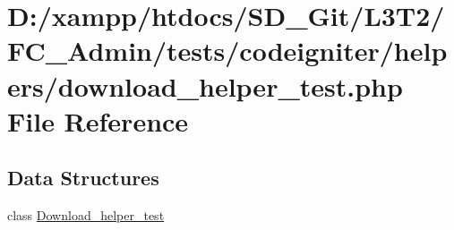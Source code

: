 \hypertarget{download__helper__test_8php}{}\section{D\+:/xampp/htdocs/\+S\+D\+\_\+\+Git/\+L3\+T2/\+F\+C\+\_\+\+Admin/tests/codeigniter/helpers/download\+\_\+helper\+\_\+test.php File Reference}
\label{download__helper__test_8php}
\subsection*{Data Structures}
\begin{DoxyCompactItemize}
\item 
class \hyperlink{class_download__helper__test}{Download\+\_\+helper\+\_\+test}
\end{DoxyCompactItemize}
